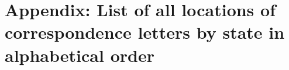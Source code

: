 \documentclass[output=paper]{langsci/langscibook}
\begin{document}
\section*{Appendix: List of all locations of correspondence letters by state in alphabetical order}
\label{sec:rocker:appendix}

 
%
%
%
%
%
\end{document}
